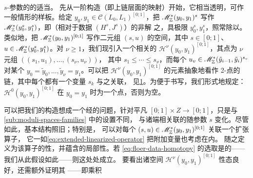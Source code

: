 $s$-参数的\trInhomogeneous\trPseudoholomorphicMap{}的适当\trModuliSpace。
先从一阶构造（即上链层面的映射）开始，它相当透明，可作一般情形的样板。给定
$y_0,y_1\in\mathscr{C}(L_0,L_1)^{[0;1]}$，把 $\mathscr{M}^*_{\mathbb{Z}}(y_0,y_1)^s$ 写作
$\mathscr{M}^*_{\mathbb{Z}}(y_0^s,y_1^s)$，即\trFloerEquation（相对于数据 $(H^s,J^s)$）的非\trStationary{}解%
之\trModuliSpace{}，具极限 $y_0^s,y_1^s$，照常除以\trTranslation。类似地，把
$\mathscr{M}^*_{\mathbb{Z}}(y_0,y_1)^{[0;1]}$ 写作二元组 $(s,u)$ 的空间，其中 $s\in[0;1]$、
$u\in\mathscr{M}^*_{\mathbb{Z}}(y_0^s,y_1^s)$。对 $\nu\ge 1$，我们现引入一个相关的\trModuliSpace{}
$\mathscr{H}^{\nu}(y_0,y_1)^{[0;1]}$，其点为 $\nu$ 元组 $((s_1,u_1),\ldots,(s_{\nu},u_{\nu}))$，
其中 $s_1\le\cdots\le s_{\nu}$，而每个 $u_v\in\mathscr{M}^*_{\mathbb{Z}}(\tilde{y}_{i-1},\tilde{y}_i)^{s_v}$
对某个 $y_0=\tilde{y}_0,\ldots,\tilde{y}_{\nu}=y_1$。可以把 $\mathscr{H}^{\nu}(y_0,y_1)^{[0;1]}$
的元素抽象地看作 2-点\trDisk{}的链，其中每个\trDisk{}都有一个变量 $s_k$ 与之关联，
见\cref{fig:homotopy-chain-discs}。为便于书写，我们形式地规定：$\mathscr{H}^0(y_0,y_1)^{[0;1]}$ 在 $y_0=y_1$
时为一个点，否则为空。
\begin{figure}
\centering
{}
\caption{}\label{fig:homotopy-chain-discs}
\end{figure}
可以把我们的构造想成一个经\trParametrization{}的\trModuliSpace{}问题，针对平凡\trFamily{}
$[0;1]\times Z\to[0;1]$，只是与\cref{sub:moduli-spaces-families} 中的设置不同，
与诸端相关联的\trFloerDatum{}随参数 $s$ 变化。尽管如此，基本结构照旧；特别是，
可以对每个 $(s,u)\in\mathscr{M}^*_{\mathbb{Z}}(y_0,y_1)^{[0;1]}$ 关联一个扩张\trLinearization{}算子，
它一如\eqref{eq:extended-linearized-operator} 把附加变量也考虑在内。\trRegularity{}
随之定义为该算子的\trSurjective{}性，并蕴含\trModuliSpace{}的局部\trSmooth{}性。若\trHomotopy{}
\eqref{eq:floer-data-homotopy} 的选取是\trGeneric{}的——我们从此假设如此——则这处处成立。
要看出诸空间 $\mathscr{H}^{\nu}(y_0,y_1)^{[0;1]}$ 性态良好，还需额外证明其%
\trBoundaryFace——即乘积
